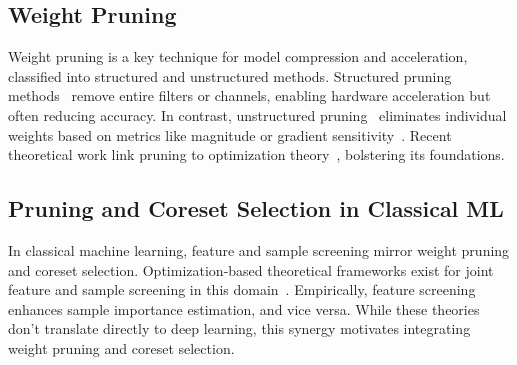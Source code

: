 \subsection{Weight Pruning}  
Weight pruning is a key technique for model compression and acceleration, classified into structured and unstructured methods. Structured pruning methods~\cite{filterspruning,he2018soft,jiang2022channel,elkerdawy2022fire,guan2022dais,nonnenmacher2021sosp,alvarez2016learning,murray2015auto} remove entire filters or channels, enabling hardware acceleration but often reducing accuracy. In contrast, unstructured pruning~\cite{tanaka2020pruning,lee2018snip,han2015deep,frankle2018lottery} eliminates individual weights based on metrics like magnitude or gradient sensitivity~\cite{evci2020rigging,han2015learning,wen2016learning,blakeney2020pruning,renda2020comparing,hassibi1992second,lecun1989optimal}. Recent theoretical work link pruning to optimization theory~\cite{grosse2016kronecker,zhou2021effective,srinivas2017training,louizos2017learning,qian2021probabilistic}, bolstering its foundations.

\subsection{Pruning and Coreset Selection in Classical ML}
In classical machine learning, feature and sample screening mirror weight pruning and coreset selection. Optimization-based theoretical frameworks exist for joint feature and sample screening in this domain~\cite{shibagaki2016simultaneous,zhang2017scaling}. Empirically, feature screening enhances sample importance estimation, and vice versa. While these theories don't translate directly to deep learning, this synergy motivates integrating weight pruning and coreset selection.